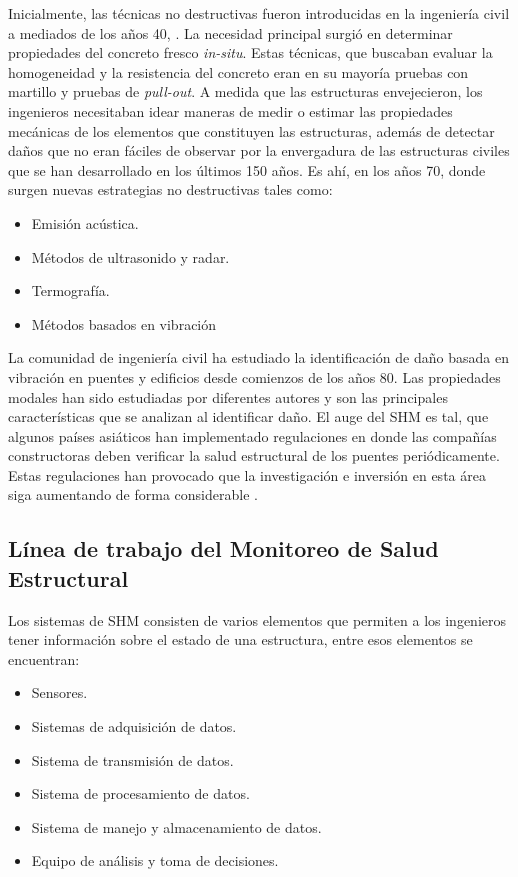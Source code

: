 Inicialmente, las técnicas no destructivas fueron introducidas en la ingeniería civil a mediados de los años 40, \citep{mohamed2014}. La necesidad principal surgió en determinar propiedades del concreto fresco \textit{in-situ}. Estas técnicas, que buscaban evaluar la homogeneidad y la resistencia del concreto eran en su mayoría pruebas con martillo y pruebas de \textit{pull-out}. A medida que las estructuras envejecieron, los ingenieros necesitaban idear maneras de medir o estimar las propiedades mecánicas de los elementos que constituyen las estructuras, además de detectar daños que no eran fáciles de observar por la envergadura de las estructuras civiles que se han desarrollado en los últimos 150 años. Es ahí, en los años 70, donde surgen nuevas estrategias no destructivas tales como:

    \begin{itemize}
        \item Emisión acústica.
        \item Métodos de ultrasonido y radar.
        \item Termografía.
        \item Métodos basados en vibración
    \end{itemize}

La comunidad de ingeniería civil ha estudiado la identificación de daño basada en vibración en puentes y edificios desde comienzos de los años 80. Las propiedades modales han sido estudiadas por diferentes autores y son las principales características que se analizan al identificar daño. El auge del SHM es tal, que algunos países asiáticos han implementado regulaciones en donde las compañías constructoras deben verificar la salud estructural de los puentes periódicamente. Estas regulaciones han provocado que la investigación e inversión en esta área siga aumentando de forma considerable \citep{chen2018}. 

\subsection{Línea de trabajo del Monitoreo de Salud Estructural}

Los sistemas de SHM consisten de varios elementos que permiten a los ingenieros tener información sobre el estado de una estructura, entre esos elementos se encuentran:

\begin{itemize}
    \item Sensores.
    \item Sistemas de adquisición de datos.
    \item Sistema de transmisión de datos.
    \item Sistema de procesamiento de datos.
    \item Sistema de manejo y almacenamiento de datos.
    \item Equipo de análisis y toma de decisiones.
\end{itemize}

